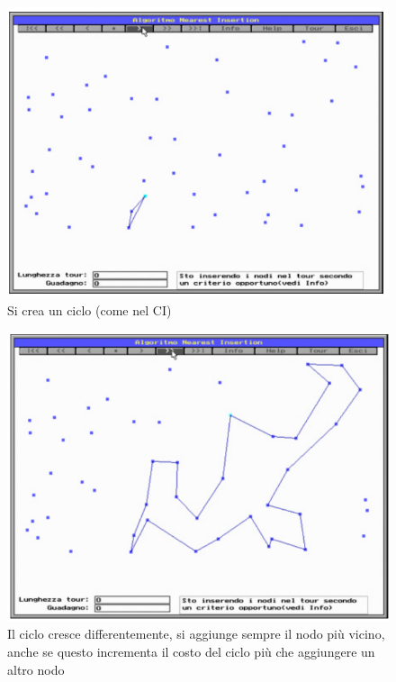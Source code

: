 \documentclass{article}
\begin{document}
\begin{figure}[H]
    \centering
    \includegraphics[scale=0.5]{images/NI1.png}
    \caption{Si crea un ciclo (come nel CI)}
\end{figure}

\begin{figure}[H]
    \centering
    \includegraphics[scale=0.5]{images/NI2.png}
    \caption{Il ciclo cresce differentemente, si aggiunge sempre il nodo più vicino,
        anche se questo incrementa il costo del ciclo più che aggiungere un altro nodo}
\end{figure}
\end{document}
